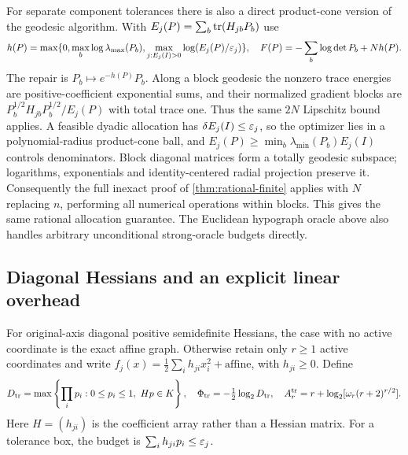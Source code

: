 For separate component tolerances there is also a direct product-cone
version of the geodesic algorithm. With
$E_j(P)=\sum_b\operatorname{tr}(H_{jb}P_b)$ use
\[
 h(P)=\max\{0,\max_b\log\lambda_{\max}(P_b),
                    \max_{j:E_j(I)>0}\log(E_j(P)/\varepsilon_j)\},
 \quad F(P)=-\sum_b\log\det P_b+Nh(P).
\]
The repair is $P_b\mapsto e^{-h(P)}P_b$. Along a block geodesic the
nonzero trace energies are positive-coefficient exponential sums, and
their normalized gradient blocks are
$P_b^{1/2}H_{jb}P_b^{1/2}/E_j(P)$ with total trace one. Thus the same
$2N$ Lipschitz bound applies. A feasible dyadic allocation has
$\delta E_j(I)\le\varepsilon_j$, so the optimizer lies in a polynomial-radius
product-cone ball, and
$E_j(P)\ge\min_b\lambda_{\min}(P_b)E_j(I)$ controls denominators.
Block diagonal matrices form a totally geodesic subspace; logarithms,
exponentials and identity-centered radial projection preserve it.
Consequently the full inexact proof of \cref{thm:rational-finite} applies
with $N$ replacing $n$, performing all numerical operations within blocks.
This gives the same rational allocation guarantee. The Euclidean
hypograph oracle above also handles arbitrary unconditional strong-oracle
budgets directly.

\subsection{Diagonal Hessians and an explicit linear overhead}

For original-axis diagonal positive semidefinite Hessians, the case with
no active coordinate is the exact affine graph. Otherwise retain only
$r\ge1$ active coordinates and write
$f_j(x)=\frac12\sum_i h_{ji}x_i^2+\text{affine}$, with $h_{ji}\ge0$.
Define
\[
 D_{\rm tr}=\max\left\{\prod_ip_i:0\le p_i\le1,
                                    \ Hp\in K\right\},
 \quad\Phi_{\rm tr}=-\tfrac12\log_2D_{\rm tr},\quad
 A_r^{\rm tr}=r+\log_2[\omega_r(r+2)^{r/2}].
\]
Here $H=(h_{ji})$ is the coefficient array rather than a Hessian matrix.
For a tolerance box, the budget is $\sum_i h_{ji}p_i\le\varepsilon_j$.

